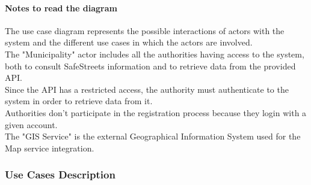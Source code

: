 	\paragraph{Notes to read the diagram}
		The use case diagram represents the possible interactions of actors with the system and the different use cases in which the actors are involved.\\

		The "Municipality" actor includes all the authorities having access to the system, both to consult SafeStreets information and to retrieve data from the provided API.\\
		
		Since the API has a restricted access, the authority must authenticate to the system in order to retrieve data from it.\\
		
		Authorities don't participate in the registration process because they login with a given account.\\
		
		The "GIS Service" is the external Geographical Information System used for the Map service integration.\\

\clearpage

\subsubsection{Use Cases Description}

